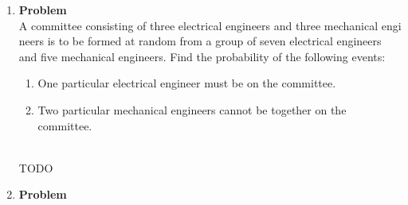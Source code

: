 \documentclass[12pt]{article}
\newenvironment{Ex}{\textbf{Problem}\vspace{.75em}\\}{}
\begin{document}
\begin{enumerate}
\begin{Ex}
    finding them with probability $0.1$, whether or not she already
    looked in the same place. (After all, she doesnt have her glasses
    on and she is in a hurry.)
    \begin{enumerate}
    \item Given that Professor Plum didnt find the glasses in her
      drawer after looking one time, what is the conditional
      probability the glasses are on the table?
    \item Given that she didnt find the glasses after looking for them
      in the drawer and on the table once each, what is the
      conditional probability they are in the briefcase?
    \item Given that she failed to find the glasses after looking in
      the drawer twice, on the table twice, and in the briefcase once,
      what is the conditional probability she left the glasses at the
      office?
    \end{enumerate}
    Note: Assume conditional independence of each search i.e., if $A$
    is the event that the glasses were not found after the first
    drawer search and B is the event that the glasses were not found
    after the second drawer search, then we have $P(A \cap B | C) =
    P(A|C)P(B|C)$ , if $P(C) > 0$.
    \begin{solution} \hfill \\
      {\huge TODO}
    \end{solution}
  \end{Ex}
  \item
    \begin{Ex}
      A committee consisting of three electrical engineers and three
      mechanical engi neers is to be formed at random from a group of
      seven electrical engineers and five mechanical engineers. Find
      the probability of the following events:
      \begin{enumerate}
      \item One particular electrical engineer must be on the committee.
      \item Two particular mechanical engineers cannot be together on
        the committee.
      \end{enumerate}
      \begin{solution} \hfill \\
        {\huge TODO}
      \end{solution}
    \end{Ex}
  \item
    \begin{Ex}

\end{Ex}
\end{enumerate}
\end{document}
